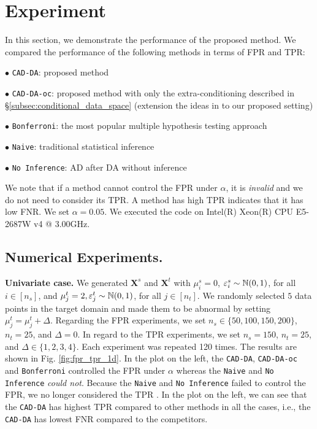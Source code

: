 \section{Experiment} \label{sec:experment}


In this section, we demonstrate the performance of the proposed method.
%
We compared the performance of the following methods in terms of FPR and TPR:

$\bullet$ {\tt CAD-DA}: proposed method

$\bullet$ {\tt CAD-DA-oc}: proposed method with only the extra-conditioning described in \S \ref{subsec:conditional_data_space} (extension the ideas in \cite{lee2016exact, duy2021exact} to our proposed setting)

$\bullet$ {\tt Bonferroni}: the most popular multiple hypothesis testing approach

$\bullet$ {\tt Naive}: traditional statistical inference

$\bullet$ {\tt No Inference}: AD after DA without inference

%
We note that if a method cannot control the FPR under $\alpha$, it is \emph{invalid} and we do not need to consider its TPR.
%
A method has high TPR indicates that it has low FNR.
%
We set $\alpha = 0.05$.
%
We executed the code on Intel(R) Xeon(R) CPU E5-2687W v4 @ 3.00GHz.

\subsection{Numerical Experiments.}

\textbf{Univariate case.} We generated $\bm X^s$ and $\bm X^t$ with $\mu^s_i = 0$, $\varepsilon^s_i \sim \mathbb{N}(0, 1)$, for all $i \in [n_s]$, and $ \mu^t_j = 2, \varepsilon^t_j \sim \mathbb{N}(0, 1)$, for all $j \in [n_t]$.
%
We randomly selected $5$ data points in the target domain and made them to be abnormal by setting $\mu^t_j = \mu^t_j + \Delta$.
%
Regarding the FPR experiments, we set $n_s \in \{ 50, 100, 150, 200 \}$, $n_t = 25$, and $\Delta = 0$.
%
In regard to the TPR experiments, we set $n_s = 150$, $n_t = 25$, and $\Delta \in \{ 1, 2, 3, 4\} $. 
%
Each experiment was repeated 120 times.
%
The results are shown in Fig. \ref{fig:fpr_tpr_1d}.
%
In the plot on the left, the {\tt CAD-DA}, {\tt CAD-DA-oc} and {\tt Bonferroni} controlled the FPR under $\alpha$ whereas the {\tt Naive} and {\tt No Inference} \emph{could not}. 
%
Because the {\tt Naive} and {\tt No Inference} failed to control the FPR, we no longer considered the TPR .
%
In the plot on the left, we can see that the {\tt CAD-DA} has highest TPR compared to other methods in all the cases, i.e., the {\tt CAD-DA} has lowest FNR compared to the competitors.



